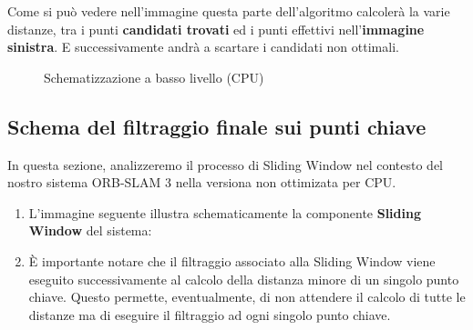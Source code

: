 \documentclass[12pt,a4paper]{report}
\begin{document}
Come si può vedere nell'immagine questa parte dell'algoritmo calcolerà la varie distanze, tra i punti \textbf{candidati trovati} ed i punti effettivi nell'\textbf{immagine sinistra}.
E successivamente andrà a scartare i candidati non ottimali.



\begin{figure}[H]
    \centering
    \caption{Schematizzazione a basso livello (CPU) }
\end{figure}

\subsection{Schema del filtraggio finale sui punti chiave}

In questa sezione, analizzeremo il processo di Sliding Window nel contesto del nostro sistema ORB-SLAM 3 nella versiona non ottimizata per CPU. 

\begin{enumerate}
    \item L'immagine seguente illustra schematicamente la componente \textbf{Sliding Window} del sistema:
    
    \item È importante notare che il filtraggio associato alla Sliding Window viene eseguito successivamente al calcolo della distanza minore di un singolo punto chiave. Questo permette, eventualmente, di non attendere il calcolo di tutte le distanze ma di eseguire il filtraggio ad ogni singolo punto chiave.
\end{enumerate}
\end{document}
